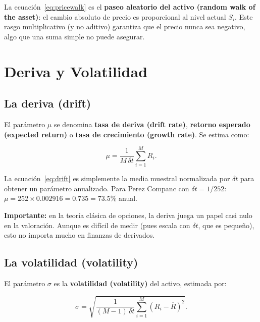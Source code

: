 \documentclass[12pt]{article}
\begin{document}
\begin{intuicionmat}
La ecuaci\'on~\eqref{eq:pricewalk} es el \textbf{paseo aleatorio del activo
(random walk of the asset)}: el cambio absoluto de precio es proporcional al nivel
actual $S_i$. Este rasgo multiplicativo (y no aditivo) garantiza que el precio
nunca sea negativo, algo que una suma simple no puede asegurar.
\end{intuicionmat}

\section{Deriva y Volatilidad}

\subsection{La deriva (drift)}

El par\'ametro $\mu$ se denomina \textbf{tasa de deriva (drift rate)},
\textbf{retorno esperado (expected return)} o \textbf{tasa de crecimiento
(growth rate)}. Se estima como:

\begin{equation}
  \mu = \frac{1}{M\,\delta t}\sum_{i=1}^{M} R_i.
  \label{eq:drift}
\end{equation}

\begin{intuicionmat}
La ecuaci\'on~\eqref{eq:drift} es simplemente la media muestral normalizada por
$\delta t$ para obtener un par\'ametro anualizado. Para Perez Companc con
$\delta t = 1/252$: $\mu = 252 \times 0.002916 = 0.735 = 73.5\%$ anual.
\end{intuicionmat}

\textbf{Importante:} en la teor\'ia cl\'asica de opciones, la deriva juega un papel
casi nulo en la valoraci\'on. Aunque es dif\'icil de medir (pues escala con $\delta t$,
que es peque\~no), esto no importa mucho en finanzas de derivados.

\subsection{La volatilidad (volatility)}

El par\'ametro $\sigma$ es la \textbf{volatilidad (volatility)} del activo, estimada por:

\begin{equation}
  \sigma = \sqrt{\frac{1}{(M-1)\,\delta t}\sum_{i=1}^{M}(R_i - \overline{R})^2}.
  \label{eq:vol}
\end{equation}
\end{document}

